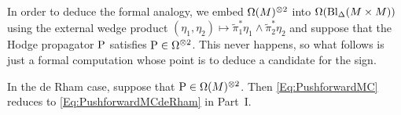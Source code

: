 \documentclass[\MainFolder/Text.tex]{subfiles}
\begin{document}
In order to deduce the formal analogy, we embed $\Omega(M)^{\otimes 2}$ into $\Omega(\mathrm{Bl}_{\Delta}(M\times M))$ using the external wedge product $(\eta_1,\eta_2)\mapsto \tilde{\pi}_1^*\eta_1 \wedge \tilde{\pi}_2^*\eta_2$ and suppose that the Hodge propagator $\mathrm{P}$ satisfies $\mathrm{P} \in \Omega^{\otimes 2}$. This never happens, so what follows is just a formal computation whose point is to deduce a candidate for the sign.%

\begin{Proposition}\label{Prop:FinDimAnalog}
In the de Rham case, suppose that $\mathrm{P}\in \Omega(M)^{\otimes 2}$. Then \eqref{Eq:PushforwardMC} reduces to \eqref{Eq:PushforwardMCdeRham} in Part~I.
\end{Proposition}
\end{document}
